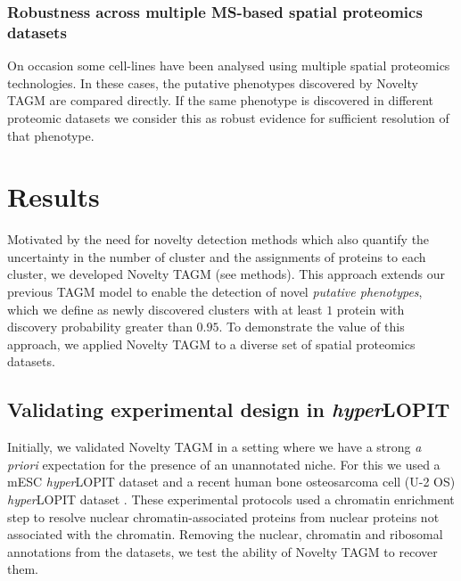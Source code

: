 \documentclass[12pt,english]{article}
\begin{document}
\subsubsection{Robustness across multiple MS-based spatial proteomics datasets}
On occasion some cell-lines have been analysed using multiple spatial proteomics technologies. In these cases, the putative phenotypes discovered by Novelty TAGM are compared directly. If the same phenotype is discovered in different proteomic datasets we consider this as robust evidence for sufficient resolution of that phenotype.

\clearpage
\section{Results}
Motivated by the need for novelty detection methods which also quantify the uncertainty in the number of cluster and the assignments of proteins to each cluster, we developed Novelty TAGM (see methods). This approach extends our previous TAGM model to enable the detection of novel \textit{putative phenotypes}, which we define as newly discovered clusters with at least $1$ protein with discovery probability greater than $0.95$. To demonstrate the value of this approach, we applied Novelty TAGM to a diverse set of spatial proteomics datasets.


\subsection{Validating experimental design in \textit{hyper}LOPIT}
Initially, we validated Novelty TAGM in a setting where we have a strong \textit{a priori} expectation for the presence of an unannotated niche. For this we used a mESC \textit{hyper}LOPIT dataset \citep{hyper} and a recent human bone osteosarcoma cell (U-2 OS) \textit{hyper}LOPIT dataset \citep{Thul:2017}. These experimental protocols used a chromatin enrichment step to resolve nuclear chromatin-associated proteins from nuclear proteins not associated with the chromatin. Removing the nuclear, chromatin and ribosomal annotations from the datasets, we test the ability of Novelty TAGM to recover them.
\end{document}
